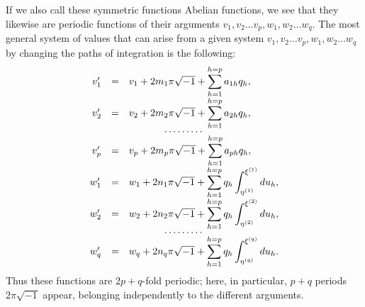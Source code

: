 \documentclass[10pt]{article}
\begin{document}
If we also call these symmetric functions Abelian functions, we see that they likewise are periodic functions of their arguments \(v_1,v_2\ldots v_p,w_1,w_2\ldots w_q\). The most general system of values that can arise from a given system \(v_1,v_2\ldots v_p,w_1,w_2\ldots w_q\) by changing the paths of integration is the following:
\[
\begin{array}{rcl}
v_1'&=&v_1+2m_1\pi\sqrt{-1}+\displaystyle\sum_{h=1}^{h=p}a_{1h}q_h,\\
v_2'&=&v_2+2m_2\pi\sqrt{-1}+\displaystyle\sum_{h=1}^{h=p}a_{2h}q_h,\\[-0.3em]
\multicolumn{3}{c}{\cdots\cdots\cdots}\\[-0.3em]
v_p'&=&v_p+2m_p\pi\sqrt{-1}+\displaystyle\sum_{h=1}^{h=p}a_{ph}q_h,\\
w_1'&=&w_1+2n_1\pi\sqrt{-1}+\displaystyle\sum_{h=1}^{h=p}q_h\int_{\eta^{(1)}}^{\xi^{(1)}}du_h,\\
w_2'&=&w_2+2n_2\pi\sqrt{-1}+\displaystyle\sum_{h=1}^{h=p}q_h\int_{\eta^{(2)}}^{\xi^{(2)}}du_h,\\[-0.3em]
\multicolumn{3}{c}{\cdots\cdots\cdots}\\[-0.3em]
w_q'&=&w_q+2n_q\pi\sqrt{-1}+\displaystyle\sum_{h=1}^{h=p}q_h\int_{\eta^{(q)}}^{\xi^{(q)}}du_h.
\end{array}
\]
Thus these functions are \(2p+q\)-fold periodic; here, in particular, \(p+q\) periods \(2\pi\sqrt{-1}\) appear, belonging independently to the different arguments.
\end{document}
